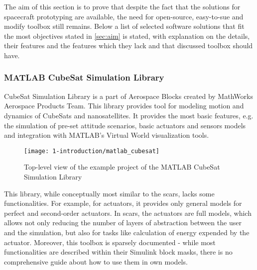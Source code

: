     The aim of this section is to prove that despite the fact that the solutions for spacecraft prototyping are available, the need for open-source, easy-to-sue and modify toolbox still remains. Below a list of selected software solutions that fit the most objectives stated in \autoref{sec:aim} is stated, with explanation on the details, their features and the features which they lack and that discussed toolbox should have.

    \subsubsection{MATLAB CubeSat Simulation Library}
        CubeSat Simulation Library is a part of Aerospace Blocks created by MathWorks Aerospace Products Team. This library provides tool for modeling motion and dynamics of CubeSats and nanosatellites. It provides the most basic features, e.g. the simulation of pre-set attitude scenarios, basic actuators and sensors models and integration with MATLAB's Virtual World visualization tools.
        
        \begin{figure}[H]
            \centering
            \texttt{[image: 1-introduction/matlab\_cubesat]}
            \caption{Top-level view of the example project of the MATLAB CubeSat Simulation Library}
            \label{fig:matlab_cubesat}
        \end{figure}

        This library, while conceptually most similar to the \ac{scars}, lacks some functionalities. For example, for actuators, it provides only general models for perfect and second-order actuators. In \ac{scars}, the actuators are full models, which allows not only reducing the number of layers of abstraction between the user and the simulation, but also for tasks like calculation of energy expended by the actuator. Moreover, this toolbox is sparsely documented - while most functionalities are described within their Simulink block masks, there is no comprehensive guide about how to use them in own models\cite{matlabcubesat}.

